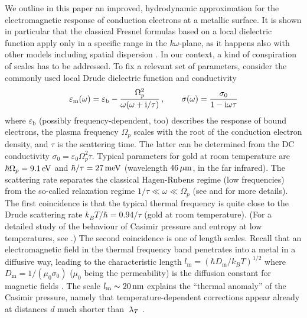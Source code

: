 \documentclass[11pt, oneside]{article}   	%
\newcommand{\lambdabar}{{\mkern+04mu\mathchar'26\mkern-09mu\lambda}}
\newcommand{\bulk}[1]{_{\mathrm{#1}}}
\def\OmegaP{\Omega_{p}}
\begin{document}
We outline in this paper an improved, hydrodynamic approximation for the electromagnetic
response of conduction electrons at a metallic surface. It is shown in particular
that the classical Fresnel formulas based on a local dielectric function apply only in 
a specific range in the $k\omega$-plane, as it happens also with other models including
spatial dispersion \cite{garcia1979introduction, DresselGruenerBook}.
In our context, a kind of conspiration of scales has to be addressed.
To fix a relevant set of parameters, consider 
the commonly used local Drude dielectric function and conductivity
\begin{equation}
\varepsilon\bulk{m}( \omega ) = \varepsilon\bulk{b} - \frac{ \Omega_p^2 }{ \omega (\omega + {\rm i} / \tau) }
\,,\qquad
\sigma(\omega) = \frac{ \sigma_0 }{ 1 - {\rm i} \omega \tau }
\label{eq:Drude-model}
\end{equation}
where $\varepsilon\bulk{b}$ (possibly frequency-dependent, too) describes the response of
bound electrons, the plasma frequency $\Omega_p$ scales with the root of the conduction
electron density, and $\tau$ is the scattering time. The latter can be determined from the
DC conductivity $\sigma_0 = \varepsilon_0 \Omega_p^2 \tau$. Typical parameters for gold
at room temperature
are $\hbar\Omega_p = 9.1\,{\rm eV}$ and $\hbar/\tau = 27\,{\rm meV}$
(wavelength $46\,\mu{\rm m}$, in the far infrared).
The scattering rate separates
the classical Hagen-Rubens regime (low frequencies) from the so-called relaxation regime
$1/ \tau \ll \omega \ll \OmegaP$ (see \citet{Sievers_1978}
and \citet[Appendix~E]{DresselGruenerBook} for more details).
The first coincidence is that the typical thermal frequency is quite close to the Drude 
scattering rate $k_B T / \hbar = 0.94/\tau$ (gold at room temperature).
(For a detailed study of the behaviour of Casimir pressure and entropy at low temperatures,
see \citet{Intravaia_2010c, Reiche_2020a}.)
The second coincidence is one of length scales. 
Recall that an electromagnetic field in the thermal frequency 
band penetrates into a metal in a diffusive way, leading to the characteristic length 
$l\bulk{m} = (\hbar D\bulk{m} / k_B T)^{1/2}$
where $D\bulk{m} = 1/(\mu_0 \sigma_0)$ ($\mu_0$ being the permeability)
is the diffusion constant for magnetic fields \citep{jackson2014klassische}.
The scale $l\bulk{m} \sim 20\,{\rm nm}$ explains the ``thermal anomaly'' of the 
Casimir pressure, namely that 
temperature-dependent corrections appear already at distances $d$ much shorter
than $\lambdabar_{T}$ \citep{Bostrom_2000b, Intravaia_2009a}.
\end{document}
